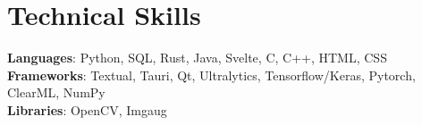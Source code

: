 \documentclass[letterpaper,11pt]{article}
\begin{document}
\section{Technical Skills}
 \begin{itemize}[leftmargin=0.15in, label={}]
    \small{\item{
     \textbf{Languages}{: Python, SQL, Rust, Java, Svelte, C, C++, HTML, CSS} \\
     \textbf{Frameworks}{: Textual, Tauri, Qt, Ultralytics, Tensorflow/Keras, Pytorch, ClearML, NumPy} \\
     \textbf{Libraries}{: OpenCV, Imgaug} \\
    }}
 \end{itemize}


\end{document}
